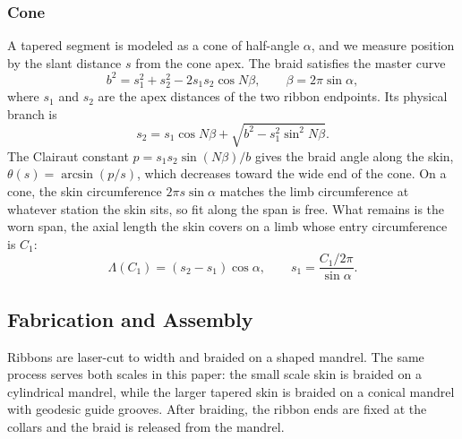 \documentclass[letterpaper, 10 pt, conference]{ieeeconf}  %
\begin{document}
\subsubsection{Cone}
A tapered segment is modeled as a cone of half-angle $\alpha$, and we measure position by the slant distance $s$ from the cone apex. The braid satisfies the master curve
\begin{equation}
b^2 = s_1^2 + s_2^2 - 2 s_1 s_2 \cos N\beta, \qquad \beta = 2\pi\sin\alpha,
\end{equation}
where $s_1$ and $s_2$ are the apex distances of the two ribbon endpoints. Its physical branch is
\begin{equation}
s_2 = s_1\cos N\beta + \sqrt{b^2 - s_1^2\sin^2 N\beta}.
\end{equation}
The Clairaut constant $p = s_1 s_2 \sin(N\beta)/b$ gives the braid angle along the skin, $\theta(s) = \arcsin(p/s)$, which decreases toward the wide end of the cone. On a cone, the skin circumference $2\pi s \sin\alpha$ matches the limb circumference at whatever station the skin sits, so fit along the span is free. What remains is the worn span, the axial length the skin covers on a limb whose entry circumference is $C_1$:
\begin{equation}
\Lambda(C_1) = (s_2 - s_1)\cos\alpha, \qquad s_1 = \frac{C_1/2\pi}{\sin\alpha}.
\end{equation}

\subsection{Fabrication and Assembly}
Ribbons are laser-cut to width and braided on a shaped mandrel. The same process serves both scales in this paper: the small scale skin is braided on a cylindrical mandrel, while the larger tapered skin is braided on a conical mandrel with geodesic guide grooves. After braiding, the ribbon ends are fixed at the collars and the braid is released from the mandrel.
\end{document}

